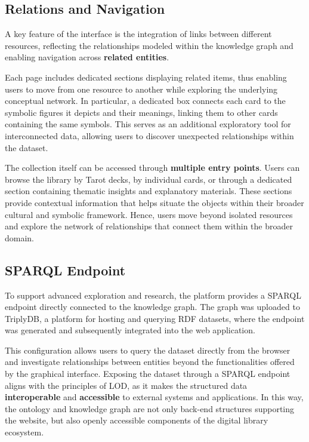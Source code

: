 \documentclass[11pt]{article}
\begin{document}
\subsection{Relations and Navigation}
A key feature of the interface is the integration of links between different resources, reflecting the relationships modeled within the knowledge graph and enabling navigation across \textbf{related entities}.

Each page includes dedicated sections displaying related items, thus enabling users to move from one resource to another while exploring the underlying conceptual network. In particular, a dedicated box connects each card to the symbolic figures it depicts and their meanings, linking them to other cards containing the same symbols. This serves as an additional exploratory tool for interconnected data, allowing users to discover unexpected relationships within the dataset.

The collection itself can be accessed through \textbf{multiple entry points}. Users can browse the library by Tarot decks, by individual cards, or through a dedicated section containing thematic insights and explanatory materials. These sections provide contextual information that helps situate the objects within their broader cultural and symbolic framework. Hence, users move beyond isolated resources and explore the network of relationships that connect them within the broader domain.

\subsection{SPARQL Endpoint}
To support advanced exploration and research, the platform provides a SPARQL endpoint directly connected to the knowledge graph. The graph was uploaded to TriplyDB, a platform for hosting and querying RDF datasets, where the endpoint was generated and subsequently integrated into the web application.

This configuration allows users to query the dataset directly from the browser and investigate relationships between entities beyond the functionalities offered by the graphical interface. Exposing the dataset through a SPARQL endpoint aligns with the principles of LOD, as it makes the structured data \textbf{interoperable} and \textbf{accessible} to external systems and applications. In this way, the ontology and knowledge graph are not only back-end structures supporting the website, but also openly accessible components of the digital library ecosystem.
\end{document}
